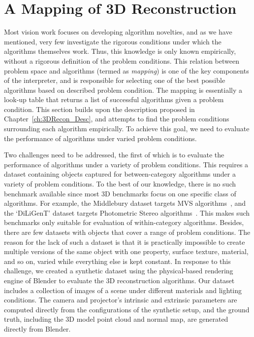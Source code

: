 
\chapter{A Mapping of 3D Reconstruction}
\label{ch:3DRecon_Mapping}
Most vision work focuses on developing algorithm novelties, and as we have mentioned, very few investigate the rigorous conditions under which the algorithms themselves work. Thus, this knowledge is only known empirically, without a rigorous definition of the problem conditions. This relation between problem space and algorithms (termed as \textit{mapping}) is one of the key components of the interpreter, and is responsible for selecting one of the best possible algorithms based on described problem condition. The mapping is essentially a look-up table that returns a list of successful algorithms given a problem condition. This section builds upon the description proposed in Chapter~\ref{ch:3DRecon_Desc}, and attempts to find the problem conditions surrounding each algorithm empirically. To achieve this goal, we need to evaluate the performance of algorithms under varied problem conditions.

Two challenges need to be addressed, the first of which is to evaluate the performance of algorithms under a variety of problem conditions. This requires a dataset containing objects captured for between-category algorithms under a variety of problem conditions. To the best of our knowledge, there is no such benchmark available since most 3D benchmarks focus on one specific class of algorithms. For example, the Middlebury dataset targets MVS algorithms~\cite{seitz2006comparison}, and the `DiLiGenT' dataset targets Photometric Stereo algorithms~\cite{shi2016benchmark}. This makes such benchmarks only suitable for evaluation of within-category algorithms. Besides, there are few datasets with objects that cover a range of problem conditions. The reason for the lack of such a dataset is that it is practically impossible to create multiple versions of the same object with one property, \eg surface texture, material, and so on, varied while everything else is kept constant. In response to this challenge, we created a synthetic dataset using the physical-based rendering engine of Blender to evaluate the 3D reconstruction algorithms. Our dataset includes a collection of images of a scene under different materials and lighting conditions. The camera and projector's intrinsic and extrinsic parameters are computed directly from the configurations of the synthetic setup, and the ground truth, including the 3D model point cloud and normal map, are generated directly from Blender.

